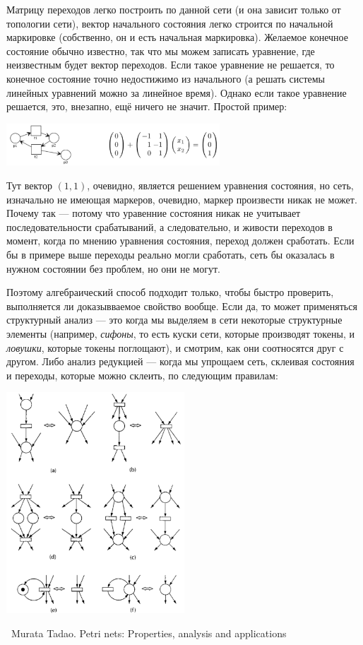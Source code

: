 \documentclass[a5paper]{article}
\newcommand{\attribution}[1] {
	\vspace{-5mm}\begin{flushright}\begin{scriptsize}%
	{\textcopyright\, #1}\end{scriptsize}\end{flushright}
}
\begin{document}
Матрицу переходов легко построить по данной сети (и она зависит только от топологии сети), вектор начального состояния легко строится по начальной маркировке (собственно, он и есть начальная маркировка). Желаемое конечное состояние обычно известно, так что мы можем записать уравнение, где неизвестным будет вектор переходов. Если такое уравнение не решается, то конечное состояние точно недостижимо из начального (а решать системы линейных уравнений можно за линейное время). Однако если такое уравнение решается, это, внезапно, ещё ничего не значит. Простой пример:

\begin{center}
	\includegraphics[width=0.6\textwidth]{algebraicAnalysisFail.png}
\end{center}

Тут вектор $(1, 1)$, очевидно, является решением уравнения состояния, но сеть, изначально не имеющая маркеров, очевидно, маркер произвести никак не может. Почему так --- потому что уравенние состояния никак не учитывает последовательности срабатываний, а следовательно, и живости переходов в момент, когда по мнению уравнения состояния, переход должен сработать. Если бы в примере выше переходы реально могли сработать, сеть бы оказалась в нужном состоянии без проблем, но они не могут.

Поэтому алгебраический способ подходит только, чтобы быстро проверить, выполняется ли доказывваемое свойство вообще. Если да, то может применяться структурный анализ --- это когда мы выделяем в сети некоторые структурные элементы (например, \textit{сифоны}, то есть куски сети, которые производят токены, и \textit{ловушки}, которые токены поглощают), и смотрим, как они соотносятся друг с другом. Либо анализ редукцией --- когда мы упрощаем сеть, склеивая состояния и переходы, которые можно склеить, по следующим правилам:

\begin{center}
	\includegraphics[width=0.5\textwidth]{petriReduction.png}
	\attribution{Murata Tadao. Petri nets: Properties, analysis and applications}
\end{center}
\end{document}

